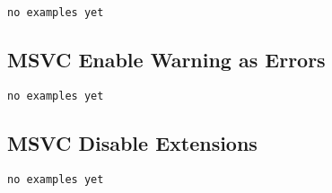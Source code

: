\begin{verbatim}
no examples yet
\end{verbatim}

\subsection{MSVC Enable Warning as Errors}

\begin{verbatim}
no examples yet
\end{verbatim}

\subsection{MSVC Disable Extensions}

\begin{verbatim}
no examples yet
\end{verbatim}
